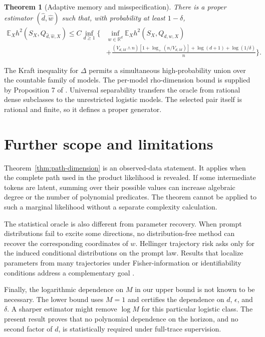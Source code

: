 \documentclass{article}
\newtheorem{theorem}{Theorem}
\theoremstyle{definition}
\theoremstyle{remark}
\newcommand{\E}{\mathbb E}
\begin{document}
\begin{theorem}[Adaptive memory and misspecification]
\label{thm:adaptive}
There is a proper estimator $(\widehat d,\widehat w)$ such that, with probability at least $1-\delta$,
\begin{align*}
\E_Xh^2(S_X,Q_{\widehat d,\widehat w,X})
\le C\inf_{d\ge1}\Bigg\{&\inf_{w\in\mathbb R^d}\E_Xh^2(S_X,Q_{d,w,X})\\
&+\frac{(V_{d,M}\wedge n)[1+\log_+(n/V_{d,M})]+\log(d+1)+\log(1/\delta)}{n}\Bigg\}.
\end{align*}
\end{theorem}

The Kraft inequality for $\Delta$ permits a simultaneous high-probability union over the countable family of models. The per-model rho-dimension bound is supplied by Proposition 7 of \citet{baraud2018rho}. Universal separability transfers the oracle from rational dense subclasses to the unrestricted logistic models. The selected pair itself is rational and finite, so it defines a proper generator.

\section{Further scope and limitations}
\label{app:limits}

Theorem~\ref{thm:path-dimension} is an observed-data statement. It applies when the complete path used in the product likelihood is revealed. If some intermediate tokens are latent, summing over their possible values can increase algebraic degree or the number of polynomial predicates. The theorem cannot be applied to such a marginal likelihood without a separate complexity calculation.

The statistical oracle is also different from parameter recovery. When prompt distributions fail to excite some directions, no distribution-free method can recover the corresponding coordinates of $w$. Hellinger trajectory risk asks only for the induced conditional distributions on the prompt law. Results that localize parameters from many trajectories under Fisher-information or identifiability conditions address a complementary goal \citep{shekhtman2025nearly}.

Finally, the logarithmic dependence on $M$ in our upper bound is not known to be necessary. The lower bound uses $M=1$ and certifies the dependence on $d$, $\epsilon$, and $\delta$. A sharper estimator might remove $\log M$ for this particular logistic class. The present result proves that no polynomial dependence on the horizon, and no second factor of $d$, is statistically required under full-trace supervision.
\end{document}
